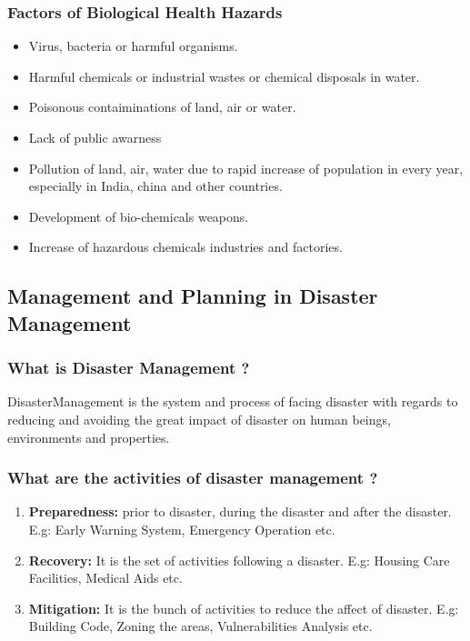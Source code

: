 \documentclass[12pt,a4paper]{article}
\begin{document}
\subsubsection*{Factors of Biological Health Hazards}
\begin{itemize}
	\item Virus, bacteria or harmful organisms.
	\item Harmful chemicals or industrial wastes or chemical disposals in water.
	\item Poisonous contaiminations of land, air or water.
	\item Lack of public awarness
	\item Pollution of land, air, water due to rapid increase of population in every year, especially in India, china and other countries.
	\item Development of bio-chemicals weapons.
	\item Increase of hazardous chemicals industries and factories.
\end{itemize}

\subsection*{Management and Planning in Disaster Management}
\subsubsection*{What is Disaster Management ?}
DisasterManagement is the system and process of facing disaster with regards to reducing and avoiding the great impact of disaster on human beings, environments and properties.

\subsubsection*{What are the activities of disaster management ?}
\begin{enumerate}
	\item \textbf{Preparedness: } prior to disaster, during the disaster and after the disaster. E.g: Early Warning System, Emergency Operation etc.
	\item \textbf{Recovery: } It is the set of activities following a disaster. E.g: Housing Care Facilities, Medical Aids etc.
	\item \textbf{Mitigation: } It is the bunch of activities to reduce the affect of disaster. E.g: Building Code, Zoning the areas, Vulnerabilities Analysis etc.
\end{enumerate}
\end{document}
